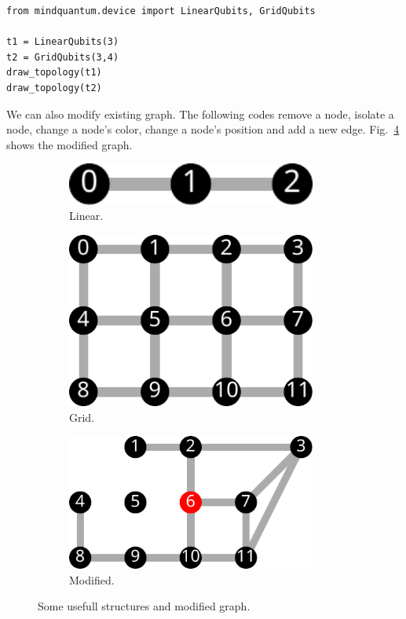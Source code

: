 \begin{lstlisting}
from mindquantum.device import LinearQubits, GridQubits
	
t1 = LinearQubits(3)
t2 = GridQubits(3,4)
draw_topology(t1)
draw_topology(t2)
\end{lstlisting}

We can also modify existing graph. The following codes remove a node, isolate a node, change a node's color, change a node's position and add a new edge. Fig.~\ref{fig:qubit-mapping-grid2} shows the modified graph.

\begin{figure}[H]
	\centering
	
	\begin{subfigure}{0.1\textwidth}
		\includegraphics[width=0.9\textwidth]{8.2_figures/linear}
		\caption{Linear.}
		\label{fig:qubit-mapping-linear}
	\end{subfigure}
	\begin{subfigure}{0.15\textwidth}
		\includegraphics[width=0.9\textwidth]{8.2_figures/grid1}
		\caption{Grid.}
		\label{fig:qubit-mapping-grid1}
	\end{subfigure}
	\begin{subfigure}{0.2\textwidth}
		\includegraphics[width=0.9\textwidth]{8.2_figures/grid2}
		\caption{Modified.}
		\label{fig:qubit-mapping-grid2}
	\end{subfigure}
	
	\caption{Some usefull structures and modified graph.}
\end{figure}

